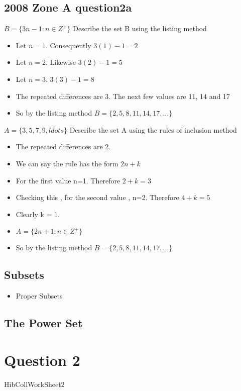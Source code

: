 \subsection*{2008  Zone A question2a}
$B = \{3n-1 :n \in Z^{+} \}$
Describe the set B using the listing method

\begin{itemize}
\item Let $n=1$. Consequently $3(1)-1 =2$
\item Let $n=2$. Likewise $3(2)-1 =5$
\item Let $n=3$. $3(3)-1 = 8 $
\item The repeated differences are 3. The next few values are 11, 14 and 17
\item So by the listing method $B= \{2,5,8,11,14,17,\ldots\}$
\end{itemize}

$A = \{3,5,7,9,ldots \}$
Describe the set A using the rules of inclusion method

\begin{itemize}
\item The repeated differences are 2.
\item We can say the rule has the form $2n+k$
\item For the first value n=1. Therefore $2+k=3$
\item Checking this , for the second value , n=2. Therefore $4+k=5$
\item Clearly k = 1.
\item $A = \{2n+1 :n \in Z^{+} \}$
\item So by the listing method $B= \{2,5,8,11,14,17,\ldots\}$
\end{itemize}





\subsection*{Subsets}

\begin{itemize}
\item Proper Subsets
\end{itemize}
\subsection*{The Power Set}




\section*{Question 2}
HibCollWorkSheet2

